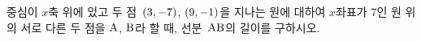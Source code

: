 중심이 $x$축 위에 있고 두 점~$(3{,}\mkern3mu\mathopen{}-7)$, $(9{,}\mkern3mu\mathopen{}-1)$을 지나는 원에 대하여 $x$좌표가 $7$인 원 위의 서로 다른 두 점을 $\mathrm{A}$, $\mathrm{B}$라 할 때, 선분~$\mathrm{AB}$의 길이를 구하시오.

